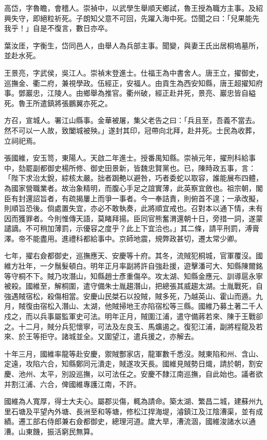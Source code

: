 \begin{pinyinscope}
高岱，字魯瞻，會稽人。崇禎中，以武學生舉順天鄉試，魯王授為職方主事。及紹興失守，即絕粒祈死。子朗知父意不可回，先躍入海中死。岱聞之曰：「兒果能先我乎！」自是不復言，數日亦卒。

葉汝厓，字衡生，岱同邑人，由舉人為兵部主事。聞變，與妻王氏出居桐塢墓所，並赴水死。

王景亮，字武侯，吳江人。崇禎末登進士。仕福王為中書舍人。唐王立，擢御史，巡撫金、衢二府，兼視學政。伍經正，安福人。由貢生為西安知縣，唐王超擢知府事。鄧巖忠，江陵人。由鄉舉為推官。衢州破，經正赴井死，景亮、巖忠皆自縊死。魯王所遣鎮將張鵬翼亦死之。

方召，宣城人。署江山縣事。金華被屠，集父老告之曰：「兵且至，吾義不當去。然不可以一人故，致闔城被殃。」遂封其印，冠帶向北拜，赴井死。士民為收葬，立祠祀焉。

張國維，安玉笥，東陽人。天啟二年進士。授番禺知縣。崇禎元年，擢刑科給事中，劾罷副都御史楊所修、御史田景新，皆魏忠賢黨也。已，陳時政五事，言：「陛下求治太銳，綜核太嚴。拙者跼艴以避咎，巧者委蛇以取容，誰能展布四體，為國家營職業者。故治象精明，而腹心手足之誼實薄，此英察宜斂也。祖宗朝，閣臣有封還詔旨者，有疏揭屢上而爭一事者。今一奉詰責，則俯首不遑；一承改擬，則順旨恐後。倘處置失宜，亦必不敢執奏，此將順宜戒也。召對本以通下情，未有因而獲罪者。今則惟傳天語，莫睹拜揚。臣同官熊奮渭還朝十日，旁措一詞，遂蒙譴謫。不可稍加薄罰，示優容之度乎？此上下宜洽也。」其二條，請平刑罰，溥膏澤。帝不能盡用。進禮科都給事中。京師地震，規弊政甚切，遷太常少卿。

七年，擢右僉都御史，巡撫應天、安慶等十府。其冬，流賊犯桐城，官軍覆沒。國維方壯年，一夕鬚髮頓白。明年正月率副將許自強赴援，遊擊潘可大、知縣陳爾銘等守桐不下。賊乃攻潛山，知縣趙士彥重傷卒。攻太湖、知縣金應元、訓導扈永寧被殺。國維至，解桐圍，遣守備朱士胤趨潛山，把總張其威趨太湖。士胤戰死，自強遇賊宿松，殺傷相當。安慶山民桀石以投賊，賊多死，乃越英山、霍山而遁。九月，賊復由宿松入潛山、太湖，他賊掃地王亦陷宿松等三縣。國維乃募土著二千人戍之，而以兵事屬監軍史可法。明年正月，賊圍江浦，遣守備蔣若來、陳于王戰卻之。十二月，賊分兵犯懷寧，可法及左良玉、馬爌遏之。復犯江浦，副將程龍及若來、於王等拒守。諸城並全。又圍望江，遣兵援之，亦解去。

十年三月，國維率龍等赴安慶，禦賊酆家店，龍軍數千悉沒。賊東陷和州、含山、定遠，攻陷六合，知縣鄭同元潰走，賊遂攻天長。國維見賊勢日熾，請於朝，割安慶、池州、太平，別設巡撫，以可法任之。安慶不隸江南巡撫，自此始也。議者欲并割江浦、六合，俾國維專護江南，不許。

國維為人寬厚，得士大夫心。屬郡災傷，輒為請命。築太湖、繁昌二城，建蘇州九里石塘及平望內外塘、長洲至和等塘，修松江捍海堤，濬鎮江及江陰漕渠，並有成績。遷工部右侍郎兼右僉都御史，總理河道。歲大旱，漕流涸，國維浚諸水以通漕。山東饑，振活窮民無算。


\end{pinyinscope}

